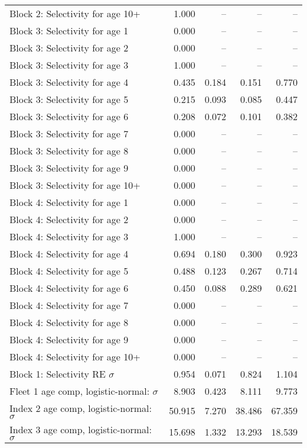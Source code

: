 \documentclass[
]{article}
\begin{document}
\begin{landscape}
\begin{longtable}[t]{lrrrr}
\addlinespace
Block 2: Selectivity for age 10+ & 1.000 & -- & -- & --\\
Block 3: Selectivity for age 1 & 0.000 & -- & -- & --\\
Block 3: Selectivity for age 2 & 0.000 & -- & -- & --\\
Block 3: Selectivity for age 3 & 1.000 & -- & -- & --\\
Block 3: Selectivity for age 4 & 0.435 & 0.184 & 0.151 & 0.770\\
\addlinespace
Block 3: Selectivity for age 5 & 0.215 & 0.093 & 0.085 & 0.447\\
Block 3: Selectivity for age 6 & 0.208 & 0.072 & 0.101 & 0.382\\
Block 3: Selectivity for age 7 & 0.000 & -- & -- & --\\
Block 3: Selectivity for age 8 & 0.000 & -- & -- & --\\
Block 3: Selectivity for age 9 & 0.000 & -- & -- & --\\
\addlinespace
Block 3: Selectivity for age 10+ & 0.000 & -- & -- & --\\
Block 4: Selectivity for age 1 & 0.000 & -- & -- & --\\
Block 4: Selectivity for age 2 & 0.000 & -- & -- & --\\
Block 4: Selectivity for age 3 & 1.000 & -- & -- & --\\
Block 4: Selectivity for age 4 & 0.694 & 0.180 & 0.300 & 0.923\\
\addlinespace
Block 4: Selectivity for age 5 & 0.488 & 0.123 & 0.267 & 0.714\\
Block 4: Selectivity for age 6 & 0.450 & 0.088 & 0.289 & 0.621\\
Block 4: Selectivity for age 7 & 0.000 & -- & -- & --\\
Block 4: Selectivity for age 8 & 0.000 & -- & -- & --\\
Block 4: Selectivity for age 9 & 0.000 & -- & -- & --\\
\addlinespace
Block 4: Selectivity for age 10+ & 0.000 & -- & -- & --\\
Block 1: Selectivity RE $\sigma$ & 0.954 & 0.071 & 0.824 & 1.104\\
Fleet 1 age comp, logistic-normal: $\sigma$ & 8.903 & 0.423 & 8.111 & 9.773\\
Index 2 age comp, logistic-normal: $\sigma$ & 50.915 & 7.270 & 38.486 & 67.359\\
Index 3 age comp, logistic-normal: $\sigma$ & 15.698 & 1.332 & 13.293 & 18.539\\*
\end{longtable}
\end{landscape}
\end{document}

